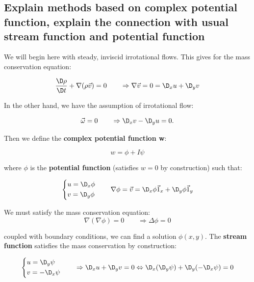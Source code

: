 \documentclass[british,french,11pt, a4paper, openany]{article}
\begin{document}
\subsection{Explain methods based on complex potential function, explain the connection with usual stream function and potential function}
We will begin here with steady, inviscid irrotational flows. This gives for the mass conservation equation:

\begin{equation}
\frac{\D \rho}{\D t} + \nabla (\rho \vec{v}) = 0 \qquad \Rightarrow \nabla \vec{v} = 0 = \D _x u + \D _y v
\end{equation}

In the other hand, we have the assumption of irrotational flow:

\begin{equation}
\vec{\omega} = 0 \qquad \Rightarrow \D _x v - \D _y u = 0.
\end{equation}

Then we define the \textbf{complex potential function w}:

\begin{equation}
w = \phi + I\psi
\end{equation}		 

where $\phi$ is the \textbf{potential function} (satisfies $w=0$ by construction) such that:

\begin{equation}
\left\{
\begin{aligned}
&u = \D _x \phi \\
&v = \D _y \phi
\end{aligned}
\right.
\qquad
\nabla \phi = \vec{v} = \D _x\phi \vec{1} _x + \D _y \phi \vec{1}_y
\end{equation}

We must satisfy the mass conservation equation:
\begin{equation}
\nabla (\nabla \phi) = 0 \qquad \Rightarrow \Delta \phi = 0 
\end{equation}

coupled with boundary conditions, we can find a solution $\phi (x,y)$. The \textbf{stream function} satisfies the mass conservation by construction:

\begin{equation}
\left\{ 
\begin{aligned}
&u = \D _y \psi\\
&v = - \D _x \psi
\end{aligned}
\right.
\qquad \Rightarrow \D _x u + \D _y v = 0 \Leftrightarrow \D _x (\D _y \psi) + \D _y (- \D _x \psi) = 0
\end{equation}
\end{document}
